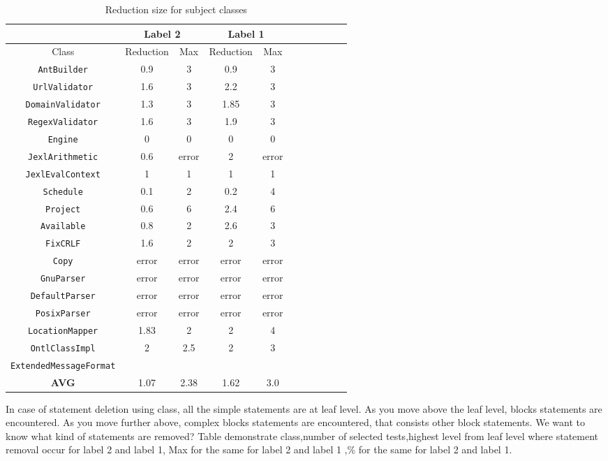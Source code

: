 \begin{table*}
\begin{center}
\begin{tabular}{|c||c|c|c|c|c||c|c|c|c|c|}
\hline
\hline
& \multicolumn{2}{|c|}{Label 2} & \multicolumn{2}{|c|}{Label 1} \\
\hline
Class & Reduction & Max & Reduction & Max  \\
\hline
\hline
{\tt AntBuilder} & 0.9 & 3 & 0.9 & 3  \\
\hline
{\tt UrlValidator} & 1.6 & 3 & 2.2 & 3  \\
\hline
{\tt DomainValidator} & 1.3 & 3 & 1.85 & 3 \\
\hline
{\tt RegexValidator} & 1.6 & 3 & 1.9 & 3 \\
\hline
{\tt Engine} & 0 & 0 & 0 & 0 \\
\hline
{\tt JexlArithmetic} & 0.6 & error & 2 & error \\ 
\hline
{\tt JexlEvalContext} & 1 & 1 & 1 & 1 \\
\hline
{\tt Schedule} & 0.1 & 2 & 0.2 & 4 \\
\hline
{\tt Project} & 0.6 & 6 & 2.4 & 6 \\
\hline
{\tt Available} & 0.8 & 2 & 2.6 & 3 \\
\hline
{\tt FixCRLF} & 1.6 & 2 & 2 & 3 \\
\hline
{\tt Copy} & error & error & error & error\\
\hline
{\tt GnuParser} & error & error & error & error \\
\hline
{\tt DefaultParser} & error & error & error & error \\
\hline
{\tt PosixParser} & error & error & error & error \\
\hline

{\tt LocationMapper} & 1.83 & 2 & 2 & 4\\
\hline
{\tt OntlClassImpl} & 2 & 2.5 & 2 & 3 \\
\hline
{\tt ExtendedMessageFormat} &  &  &  &  \\
\hline
\hline
{\bf AVG} & 1.07 & 2.38 & 1.62 & 3.0  \\
\hline
\hline
\end{tabular}
\end{center}
\caption{Reduction size for subject classes}
\label{tab:avgimproved}
\end{table*}

In case of statement deletion using class, all the simple statements are at leaf level. As you move above the leaf level, blocks statements are encountered. As you move further above, complex blocks statements are encountered, that consists other block statements. We want to know what kind of statements are removed?
Table demonstrate class,number of selected tests,highest level from leaf level where statement removal occur for label 2 and label 1,  Max for the same for  label 2 and label 1 ,\%  for the same for label 2 and label 1.

